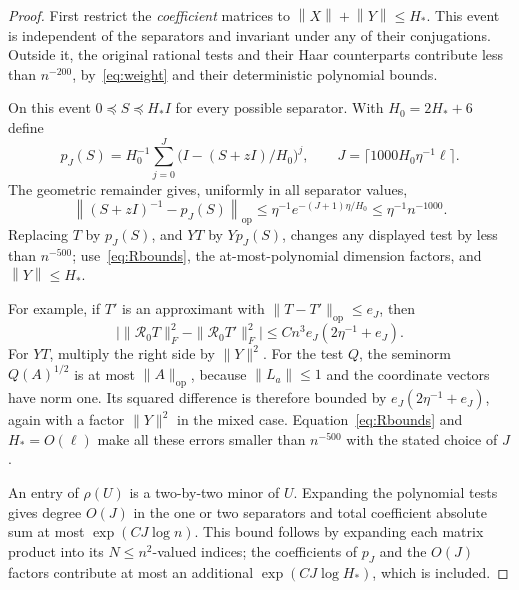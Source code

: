 \documentclass[11pt]{article}
\theoremstyle{definition}\newtheorem{definition}[theorem]{Definition}
\theoremstyle{remark}\newtheorem{remark}[theorem]{Remark}
\newcommand{\R}{\mathcal R}
\newcommand{\op}{\mathrm{op}}
\newcommand{\norm}[1]{\left\lVert#1\right\rVert}
\begin{document}
\begin{proof}
First restrict the \emph{coefficient} matrices to $\norm X+\norm Y\le H_*$. This event is independent of the separators and invariant under any of their conjugations. Outside it, the original rational tests and their Haar counterparts contribute less than $n^{-200}$, by~\eqref{eq:weight} and their deterministic polynomial bounds.

On this event $0\preceq S\preceq H_*I$ for every possible separator. With $H_0=2H_*+6$ define
\[
 p_J(S)=H_0^{-1}\sum_{j=0}^J
          \bigl(I-(S+zI)/H_0\bigr)^j,
 \qquad J=\lceil1000H_0\eta^{-1}\ell\rceil.
\]
The geometric remainder gives, uniformly in all separator values,
\[
 \norm{(S+zI)^{-1}-p_J(S)}_{\op}
 \le\eta^{-1}e^{-(J+1)\eta/H_0}\le\eta^{-1}n^{-1000}.
\]
Replacing $T$ by $p_J(S)$, and $YT$ by $Yp_J(S)$, changes any displayed test by less than $n^{-500}$; use~\eqref{eq:Rbounds}, the at-most-polynomial dimension factors, and $\norm Y\le H_*$.

For example, if $T'$ is an approximant with $\|T-T'\|_{\op}\le e_J$, then
\[
 \big|\|\R_0T\|_F^2-\|\R_0T'\|_F^2\big|
 \le C n^3 e_J(2\eta^{-1}+e_J).
\]
For $YT$, multiply the right side by $\|Y\|^2$. For the test $Q$, the seminorm $Q(A)^{1/2}$ is at most $\|A\|_{\op}$, because $\|L_a\|\le1$ and the coordinate vectors have norm one. Its squared difference is therefore bounded by
$e_J(2\eta^{-1}+e_J)$, again with a factor $\|Y\|^2$ in the mixed case. Equation~\eqref{eq:Rbounds} and $H_*=O(\ell)$ make all these errors smaller than $n^{-500}$ with the stated choice of $J$.


An entry of $\rho(U)$ is a two-by-two minor of $U$. Expanding the polynomial tests gives degree $O(J)$ in the one or two separators and total coefficient absolute sum at most $\exp(CJ\log n)$. This bound follows by expanding each matrix product into its $N\le n^2$-valued indices; the coefficients of $p_J$ and the $O(J)$ factors contribute at most an additional $\exp(CJ\log H_*)$, which is included.


\end{proof}
\end{document}
